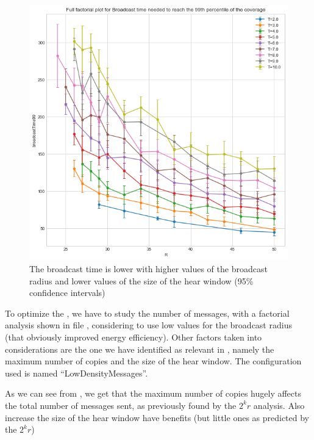 \begin{figure}
	\centering
	\includegraphics[width=\textwidth]{img/ld/broadcasttime-R-ffplot}
	\caption{The broadcast time is lower with higher values of the broadcast
	radius and lower values of the size of the hear
	window (95\% confidence intervals)}\label{fig:ldtimeff}
\end{figure}

To optimize the , we have to study the number of
messages, with a factorial analysis shown in file ,
considering to use low values for the broadcast radius (that obviously improved
energy efficiency). Other factors taken into considerations are the one we have
identified as relevant in , namely the maximum number of
copies and the size of the hear window. The configuration used is named
``LowDensityMessages''.

As we can see from , we get that the maximum number of
copies hugely affects the total number of messages sent, as previously found by
the \(2^{k}r\) analysis. Also increase the size of the hear window have benefits
(but little ones as predicted by the \(2^{k}r\))

